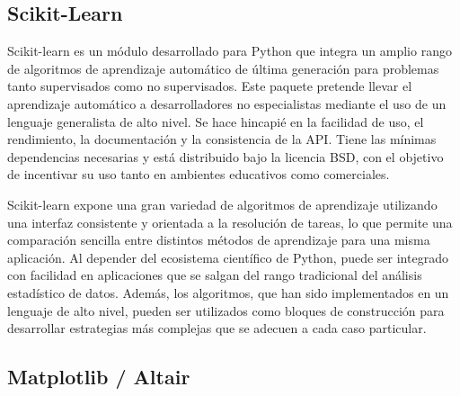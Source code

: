 

\subsection{Scikit-Learn}

Scikit-learn es un módulo desarrollado para Python que integra un amplio rango de algoritmos de aprendizaje automático de última generación para problemas tanto supervisados como no supervisados. Este paquete pretende llevar el aprendizaje automático a desarrolladores no especialistas mediante el uso de un lenguaje generalista de alto nivel. Se hace hincapié en la facilidad de uso, el rendimiento, la documentación y la consistencia de la API. Tiene las mínimas dependencias necesarias y está distribuido bajo la licencia BSD, con el objetivo de incentivar su uso tanto en ambientes educativos como comerciales.

Scikit-learn expone una gran variedad de algoritmos de aprendizaje utilizando una interfaz consistente y orientada a la resolución de tareas, lo que permite una comparación sencilla entre distintos métodos de aprendizaje para una misma aplicación. Al depender del ecosistema científico de Python, puede ser integrado con facilidad en aplicaciones que se salgan del rango tradicional del análisis estadístico de datos. Además, los algoritmos, que han sido implementados en un lenguaje de alto nivel, pueden ser utilizados como bloques de construcción para desarrollar estrategias más complejas que se adecuen a cada caso particular.


\subsection{Matplotlib / Altair}





